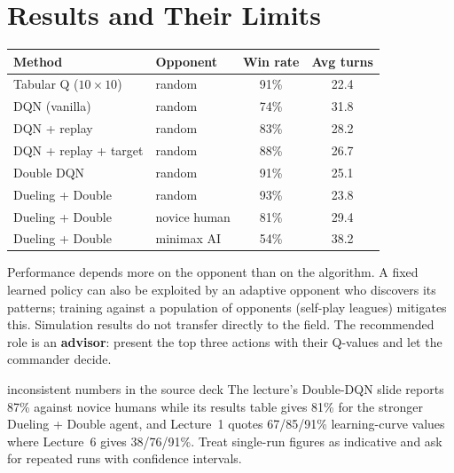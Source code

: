 \documentclass[11pt]{article}
\begin{document}
\section{Results and Their Limits}
\begin{center}\small\renewcommand{\arraystretch}{1.2}
\begin{tabular}{llcc}\toprule Method & Opponent & Win rate & Avg turns\\\midrule Tabular Q ($10\times10$) & random & 91\% & 22.4\\ DQN (vanilla) & random & 74\% & 31.8\\ DQN + replay & random & 83\% & 28.2\\ DQN + replay + target & random & 88\% & 26.7\\ Double DQN & random & 91\% & 25.1\\ Dueling + Double & random & 93\% & 23.8\\ Dueling + Double & novice human & 81\% & 29.4\\ Dueling + Double & minimax AI & 54\% & 38.2\\\bottomrule\end{tabular}\end{center}
Performance depends more on the opponent than on the algorithm. A fixed learned policy can also be exploited by an adaptive opponent who discovers its patterns; training against a population of opponents (self-play leagues) mitigates this. Simulation results do not transfer directly to the field. The recommended role is an \textbf{advisor}: present the top three actions with their Q-values and let the commander decide.
\begin{pitfall}{inconsistent numbers in the source deck}
The lecture's Double-DQN slide reports 87\% against novice humans while its results table gives 81\% for the stronger Dueling + Double agent, and Lecture~1 quotes 67/85/91\% learning-curve values where Lecture~6 gives 38/76/91\%. Treat single-run figures as indicative and ask for repeated runs with confidence intervals.
\end{pitfall}
\end{document}

